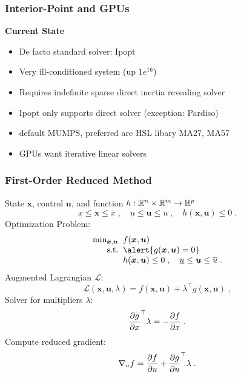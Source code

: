 \begin{frame}[fragile]
  \frametitle{Interior-Point and GPUs}
  {\bf Current State}
  \begin{itemize}
    \item De facto standard solver: Ipopt
    \item Very ill-conditioned system (up $1e^{16}$)
    \item Requires indefinite sparse direct inertia revealing solver
    \item Ipopt only supports direct solver (exception: Pardiso)
    \item default MUMPS, preferred are HSL libary MA27, MA57 
    \item \alert{GPUs want iterative linear solvers}
  \end{itemize}
\end{frame}

\begin{frame}
\frametitle{First-Order Reduced Method}
  State $\bm{x}$, control $\bm{u}$, and function $h: \REAL^{n} \times \REAL^{m} \to \REAL^{p}$
  \begin{equation}
    \underline{x} \leq \bm{x} \leq \overline{x} \;, \quad
    \underline{u} \leq \bm{u} \leq \overline{u} \;, \quad
    h(\bm{x}, \bm{u}) \leq 0 \;.
  \end{equation}
  Optimization Problem:
  \begin{equation}\label{eq:globalproblem}
    \begin{array}{r@{\;\;}l}
      \min_{\bm{x}, \bm{u}} & f(\bm{x}, \bm{u}) \\
      \text{s.t.} & \alert{g(\bm{x}, \bm{u}) = 0 }\\
                  & h(\bm{x}, \bm{u}) \leq 0 \;,
                  \quad \underline{u} \leq \bm{u} \leq \overline{u}  \;.
    \end{array}
  \end{equation}
  Augmented Lagrangian $\mathcal{L}$:
  \begin{equation}
    \mathcal{L}(\bm{x}, \bm{u}, \lambda) = f(\bm{x}, \bm{u}) + \lambda^\top g(\bm{x}, \bm{u}) \; ,
  \end{equation}
  Solver for multipliers $\lambda$:
  \begin{equation}
    \dpart{g}{x}^\top \lambda = -\dpart{f}{x}  \; .
  \end{equation}
  Compute reduced gradient:
  \begin{equation}
    \grad{f}{u} = \dpart{f}{u} + \dpart{g}{u}^\top\lambda \; .
  \end{equation}

\end{frame}



